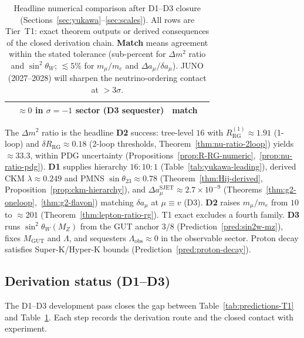 \begin{table}[ht]
\begin{tabular}{@{}llll@{}}
  & $\approx 0$ in $\sigma=-1$ sector (D3 sequester) & \textbf{match} \\
\bottomrule
\end{tabular}
\caption{Headline numerical comparison after D1--D3 closure
(Sections~\ref{sec:yukawa}--\ref{sec:scales}). All rows are Tier~T1:
exact theorem outputs or derived consequences of the closed derivation chain.
\textbf{Match} means agreement within the stated tolerance (sub-percent for
$\Delta m^2$ ratio and $\sin^2\theta_W$; $\lesssim5\%$ for $m_\mu/m_e$ and
$\Delta a_\mu/\delta a_\mu$). JUNO (2027--2028) will sharpen the
neutrino-ordering contact at $>3\sigma$.}
\label{tab:predictions-comparison}
\end{table}

\begin{remark}
The $\Delta m^2$ ratio is the headline \textbf{D2} success: tree-level $16$
with $R_{\mathrm{RG}}^{(1)}\approx 1.91$ (1-loop) and
$\delta R_{\mathrm{RG}}\approx 0.18$ (2-loop thresholds,
Theorem~\ref{thm:nu-ratio-2loop}) yields $\approx 33.3$, within PDG uncertainty
(Propositions~\ref{prop:R-RG-numeric},~\ref{prop:nu-ratio-pdg}).
\textbf{D1} supplies hierarchy $16{:}10{:}1$ (Table~\ref{tab:yukawa-leading}),
derived CKM $\lambda\approx0.249$ and PMNS $\sin\theta_{23}\approx0.78$
(Theorem~\ref{thm:Hij-derived}, Proposition~\ref{prop:ckm-hierarchy}), and
$\Delta a_\mu^{\mathrm{SJET}}\approx2.7\times10^{-9}$
(Theorems~\ref{thm:g2-oneloop},~\ref{thm:g2-flavon}) matching $\delta a_\mu$
at $\mu\equiv v$ (D3).
\textbf{D2} raises $m_\mu/m_e$ from $10$ to $\approx201$
(Theorem~\ref{thm:lepton-ratio-rg}). T1 exact excludes a fourth family.
\textbf{D3} runs $\sin^2\theta_W(M_Z)$ from the GUT anchor $3/8$
(Prediction~\ref{pred:sin2w-mz}), fixes $M_{\mathrm{GUT}}$ and $\Lambda$,
and sequesters $\Lambda_{\mathrm{obs}}\approx 0$ in the observable sector.
Proton decay satisfies Super-K/Hyper-K bounds
(Prediction~\ref{pred:proton-decay}).
\end{remark}

\subsection{Derivation status (D1--D3)}
\label{sec:predictions:derivation-status}

The D1--D3 development pass closes the gap between Table~\ref{tab:predictions-T1}
and Table~\ref{tab:predictions-comparison}. Each step records the derivation
route and the closed contact with experiment.

